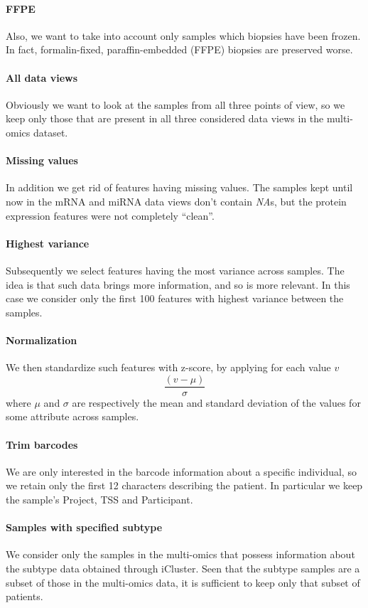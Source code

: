 \paragraph{FFPE} Also, we want to take into account only samples which biopsies have been frozen. In fact, formalin-fixed, paraffin-embedded (FFPE) biopsies are preserved worse.
\paragraph{All data views} Obviously we want to look at the samples from all three points of view, so we keep only those that are present in all three considered data views in the multi-omics dataset.
\paragraph{Missing values} In addition we get rid of features having missing values. The samples kept until now in the mRNA and miRNA data views don't contain \textit{NA}s, but the protein expression features were not completely ``clean''.\
\paragraph{Highest variance} Subsequently we select features having the most variance across samples. The idea is that such data brings more information, and so is more relevant. In this case we consider only the first 100 features with highest variance between the samples.
\paragraph{Normalization} We then standardize such features with z-score, by applying for each value $v$
\begin{equation*}
    \frac{(v-\mu)}{\sigma}
\end{equation*}
where $\mu$ and $\sigma$ are respectively the mean and standard deviation of the values for some attribute across samples.
\paragraph{Trim barcodes} We are only interested in the barcode information about a specific individual, so we retain only the first 12 characters describing the patient. In particular we keep the sample's Project, TSS and Participant.
\paragraph{Samples with specified subtype} We consider only the samples in the multi-omics that possess information about the subtype data obtained through iCluster. Seen that the subtype samples are a subset of those in the multi-omics data, it is sufficient to keep only that subset of patients.


